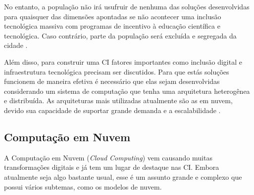 No entanto, a população não irá usufruir de nenhuma das soluções desenvolvidas para quaisquer das dimensões apontadas se não acontecer uma inclusão tecnológica massiva com programas de incentivo à educação científica e tecnológica. Caso contrário, parte da população será excluída e segregada da cidade \cite{patricia}.

Além disso, para construir uma CI fatores importantes como inclusão digital e infraestrutura tecnológica precisam ser discutidos. Para que estás soluções funcionem de maneira efetiva é necessário que elas sejam desenvolvidas considerando um sistema de computação que tenha uma arquitetura heterogênea e distribuída. As arquiteturas mais utilizadas atualmente são as em nuvem, devido sua capacidade de suportar grande demanda e a escalabilidade \cite{patricia}. 

\subsection{Computação em Nuvem}
A Computação em Nuvem (\textit{Cloud Computing}) vem causando muitas transformações digitais e já tem um lugar de destaque nas CI. Embora atualmente seja algo bastante usual, esse é um assunto grande e complexo que possui vários subtemas, como os modelos de nuvem.

